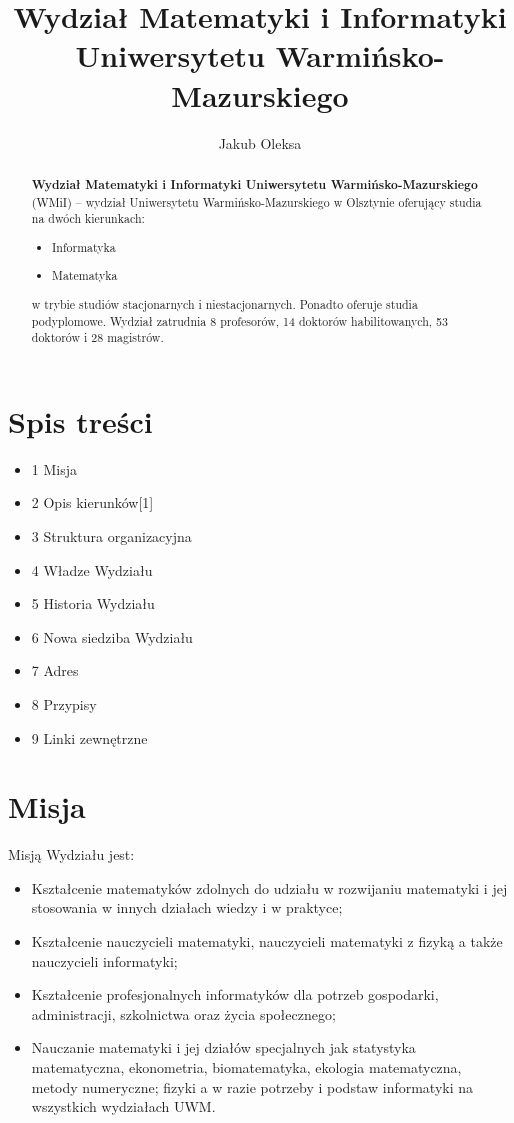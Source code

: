 \documentclass[a4paper,12pt]{article}
\title{Wydział Matematyki i Informatyki Uniwersytetu
Warmińsko-Mazurskiego}
\author{Jakub Oleksa}
\begin{document}
\maketitle
\begin{abstract}
\textbf{Wydział Matematyki i Informatyki Uniwersytetu Warmińsko-Mazurskiego} (WMiI) – wydział Uniwersytetu Warmińsko-Mazurskiego w Olsztynie oferujący studia na dwóch kierunkach:
\begin{itemize}
	\item Informatyka
	\item Matematyka
\end{itemize}
w trybie studiów stacjonarnych i niestacjonarnych. Ponadto oferuje studia podyplomowe.
Wydział zatrudnia 8 profesorów, 14 doktorów habilitowanych, 53 doktorów i 28 magistrów.
\end{abstract}
\section{Spis treści}
\begin{itemize}
	\item 1 Misja
	\item 2 Opis kierunków[1]
	\item 3 Struktura organizacyjna
	\item	4 Władze Wydziału
	\item	5 Historia Wydziału
	\item	6 Nowa siedziba Wydziału
	\item	7 Adres
	\item	8 Przypisy
	\item	9 Linki zewnętrzne
\end{itemize}
\section{Misja}

Misją Wydziału jest:
\begin{itemize}
\item Kształcenie matematyków zdolnych do udziału w rozwijaniu matematyki i jej stosowania w innych
działach wiedzy i w praktyce;
\item Kształcenie nauczycieli matematyki, nauczycieli matematyki z fizyką a także nauczycieli informatyki;
\item Kształcenie profesjonalnych informatyków dla potrzeb gospodarki, administracji, szkolnictwa oraz życia
społecznego;
\item Nauczanie matematyki i jej działów specjalnych jak statystyka matematyczna, ekonometria,
biomatematyka, ekologia matematyczna, metody numeryczne; fizyki a w razie potrzeby i podstaw
informatyki na wszystkich wydziałach UWM.
\end{itemize}
\end{document}
